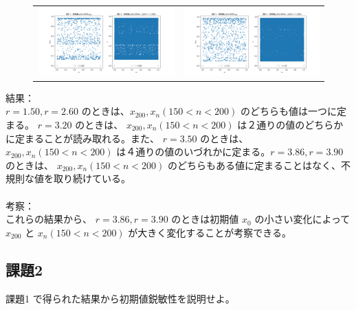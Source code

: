 \begin{figure}[htbp]
\begin{tabular}{cc}
    \begin{minipage}[t]{0.45\hsize}
      \centering
      \includegraphics[keepaspectratio, scale=0.25]{images/Problem2/ctest3_5.png}
    \end{minipage} &
    \begin{minipage}[t]{0.45\hsize}
      \centering
      \includegraphics[keepaspectratio, scale=0.25]{images/Problem2/ctest3_6.png}
    \end{minipage}
  \end{tabular}
\end{figure}


結果：\\
$r = 1.50, r = 2.60$ のときは、$x_{200}, x_n (150 < n < 200)$ のどちらも値は一つに定まる。 $r = 3.20$ のときは、 $x_{200}, x_n (150 < n < 200)$ は２通りの値のどちらかに定まることが読み取れる。また、 $r = 3.50$ のときは、 $x_{200}, x_n (150 < n < 200)$ は４通りの値のいづれかに定まる。$r = 3.86, r = 3.90$ のときは、 $x_{200}, x_n (150 < n < 200)$ のどちらもある値に定まることはなく、不規則な値を取り続けている。\\\\

考察：\\
これらの結果から、 $r = 3.86, r = 3.90$ のときは初期値 $x_0$ の小さい変化によって$x_{200}$ と $x_n (150 < n < 200)$ が大きく変化することが考察できる。

\subsection{課題2}
課題1 で得られた結果から初期値鋭敏性を説明せよ。
